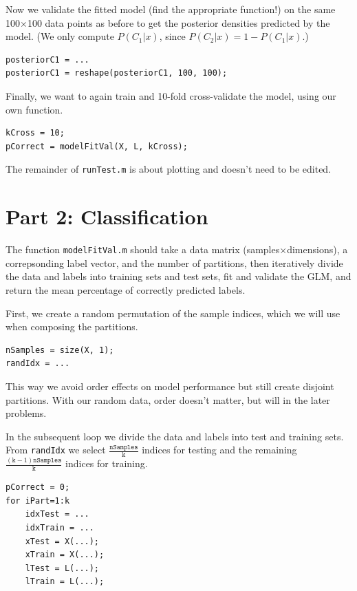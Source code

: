 \documentclass[10pt,a4paper,notitlepage]{report}
\begin{document}
Now we validate the fitted model (find the appropriate function!) on the same 100$\times$100 data points as before to get the posterior densities predicted by the model. (We only compute $P(C_1|x)$, since $P(C_2|x)=1-P(C_1|x)$.)

\begin{verbatim}
posteriorC1 = ...
posteriorC1 = reshape(posteriorC1, 100, 100);
\end{verbatim}

Finally, we want to again train and 10-fold cross-validate the model, using our own function.

\begin{verbatim}
kCross = 10;
pCorrect = modelFitVal(X, L, kCross);
\end{verbatim}

The remainder of \texttt{runTest.m} is about plotting and doesn't need to be edited.

\section*{Part 2: Classification}
The function \texttt{modelFitVal.m} should take a data matrix (samples$\times$dimensions), a correpsonding label vector, and the number of partitions, then iteratively divide the data and labels into training sets and test sets, fit and validate the GLM, and return the mean percentage of correctly predicted labels.

First, we create a random permutation of the sample indices, which we will use when composing the partitions.

\begin{verbatim}
nSamples = size(X, 1);
randIdx = ...
\end{verbatim}

This way we avoid order effects on model performance but still create disjoint partitions. With our random data, order doesn't matter, but will in the later problems.

In the subsequent loop we divide the data and labels into test and training sets. From \texttt{randIdx} we select $\frac{\texttt{nSamples}}{\texttt{k}}$ indices for testing and the remaining $\frac{(\texttt{k}-1)\texttt{nSamples}}{\texttt{k}}$ indices for training.

\begin{verbatim}
pCorrect = 0;
for iPart=1:k
    idxTest = ...
    idxTrain = ...
    xTest = X(...);
    xTrain = X(...);
    lTest = L(...);
    lTrain = L(...);
\end{verbatim}
\end{document}
